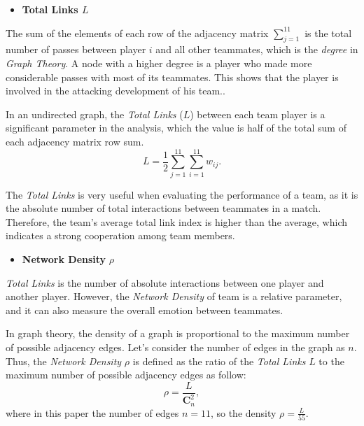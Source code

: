 \documentclass[12pt]{article}  %
\newcommand{\upcite}[1]{\textsuperscript{\textsuperscript{\cite{#1}}}}
\begin{document}
\vspace{4pt}
\begin{itemize}
    \item \textbf{Total Links $L$}
\end{itemize}

The sum of the elements of each row of the adjacency matrix $\sum_{j=1}^{11}$ is the total number of passes between player $i$ and all other teammates, which is the \textit{degree} in \textit{Graph Theory}. A node with a higher degree is a player who made more considerable passes with most of its teammates. This shows that the player is involved in the attacking development of his team..

In an undirected graph, the \textit{Total Links} ($L$) between each team player is a significant parameter in the analysis, which the value is half of the total sum of each adjacency matrix row sum.
\begin{equation}\label{eq:total_links}
    L=\frac{1}{2} \sum_{j=1}^{11} \sum_{i=1}^{11} w_{ij}.
\end{equation}

The \textit{Total Links} is very useful when evaluating the performance of a team, as it is the absolute number of total interactions between teammates in a match. Therefore, the team's average total link index is higher than the average, which indicates a strong cooperation among team members. 

\vspace{4pt}
\begin{itemize}
    \item \textbf{Network Density} $\rho$
\end{itemize}

\textit{Total Links} is the number of absolute interactions between one player and another player. However, the \textit{Network Density} of team is a relative parameter, and it can also measure the overall emotion between teammates.\upcite{2}

In graph theory, the density of a graph is proportional to the maximum number of possible adjacency edges. Let's consider the number of edges in the graph as $n$. Thus, the \textit{Network Density} $\rho$ is defined as the ratio of the \textit{Total Links} $L$ to the maximum number of possible adjacency edges as follow:
\begin{equation}\label{eq:network_density}
    \rho=\frac{L}{\mathbf{C}_n^2},
\end{equation}
where in this paper the number of edges $n=11$, so the density $\rho=\frac{L}{55}$.
\end{document}
